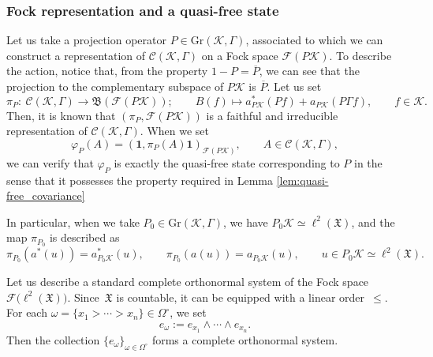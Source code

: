 \documentclass[pdftex]{sigma}
\numberwithin{equation}{section}
\newcommand{\mfrak}[1]{\mathfrak{#1}}
\newcommand{\mcal}[1]{\mathcal{#1}}
\newcommand{\mrm}[1]{\mathrm{#1}}
\begin{document}
\subsubsection{Fock representation and a quasi-free state}
Let us take a projection operator $P\in\mrm{Gr}(\mcal{K},\Gamma)$, associated to which we can construct a representation of $\mcal{C}(\mcal{K},\Gamma)$ on a Fock space $\mcal{F}(P\mcal{K})$.
To describe the action, notice that, from the property $1-P=\overline{P}$, we can see that the projection to the complementary subspace of $P\mcal{K}$ is $\overline{P}$.
Let us set
\begin{equation*}
	\pi_{P}\colon \ \mcal{C}(\mcal{K},\Gamma)\to \mfrak{B}(\mcal{F}(P\mcal{K}));\qquad B(f)\mapsto a_{P\mcal{K}}^{\ast}(Pf)+a_{P\mcal{K}}(P\Gamma f),\qquad f\in\mcal{K}.
\end{equation*}
Then, it is known that $(\pi_{P},\mcal{F}(P\mcal{K}))$ is a faithful and irreducible representation of $\mcal{C}(\mcal{K},\Gamma)$.
When we set
\begin{equation*}
	\varphi_{P}(A)=(\bm{1}, \pi_{P}(A)\bm{1})_{\mcal{F}(P\mcal{K})},\qquad A\in \mcal{C}(\mcal{K},\Gamma),
\end{equation*}
we can verify that $\varphi_{P}$ is exactly the quasi-free state corresponding to $P$ in the sense that it possesses the property required in Lemma \ref{lem:quasi-free_covariance}

In particular, when we take $P_{0}\in\mrm{Gr}(\mcal{K},\Gamma)$, we have $P_{0}\mcal{K}\simeq \ell^{2}(\mfrak{X})$, and the map $\pi_{P_{0}}$ is described as
\begin{equation*}
	\pi_{P_{0}}(a^{\ast}(u))=a_{P_{0}\mcal{K}}^{\ast}(u),\qquad \pi_{P_{0}}(a(u))=a_{P_{0}\mcal{K}}(u),\qquad u\in P_{0}\mcal{K}\simeq \ell^{2}(\mfrak{X}).
\end{equation*}

Let us describe a standard complete orthonormal system of the Fock space $\mcal{F}\big(\ell^{2}(\mfrak{X})\big)$. Since~$\mfrak{X}$ is countable, it can be equipped with a linear order~$\le$. For each $\omega=\{x_{1}>\cdots>x_{n}\}\in\Omega^{\circ}$, we set
\begin{equation*}
	e_{\omega}:=e_{x_{1}}\wedge\cdots \wedge e_{x_{n}}.
\end{equation*}
Then the collection $\{e_{\omega}\}_{\omega\in\Omega^{\circ}}$ forms a complete orthonormal system.
\end{document}
